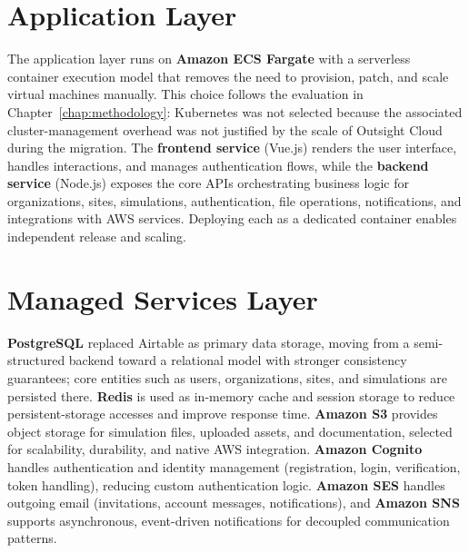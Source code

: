 \section{Application Layer}
The application layer runs on \textbf{Amazon ECS Fargate} with a serverless container execution model that removes the need to provision, patch, and scale virtual machines manually. This choice follows the evaluation in Chapter~\ref{chap:methodology}: Kubernetes was not selected because the associated cluster-management overhead was not justified by the scale of Outsight Cloud during the migration. The \textbf{frontend service} (Vue.js) renders the user interface, handles interactions, and manages authentication flows, while the \textbf{backend service} (Node.js) exposes the core APIs orchestrating business logic for organizations, sites, simulations, authentication, file operations, notifications, and integrations with AWS services. Deploying each as a dedicated container enables independent release and scaling.

\section{Managed Services Layer}
\textbf{PostgreSQL} replaced Airtable as primary data storage, moving from a semi-structured backend toward a relational model with stronger consistency guarantees; core entities such as users, organizations, sites, and simulations are persisted there. \textbf{Redis} is used as in-memory cache and session storage to reduce persistent-storage accesses and improve response time. \textbf{Amazon S3} provides object storage for simulation files, uploaded assets, and documentation, selected for scalability, durability, and native AWS integration. \textbf{Amazon Cognito} handles authentication and identity management (registration, login, verification, token handling), reducing custom authentication logic. \textbf{Amazon SES} handles outgoing email (invitations, account messages, notifications), and \textbf{Amazon SNS} supports asynchronous, event-driven notifications for decoupled communication patterns.

